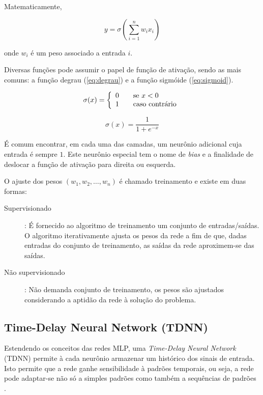 Matematicamente,

\[ y = \sigma ( \sum_{i=1}^{n} w_i x_i ) \]

onde \(w_i\) é um peso associado a entrada \(i\).

Diversas funções pode assumir o papel de função de ativação, sendo as mais comuns:
a função degrau (\ref{eq:degrau}) e a função sigmóide (\ref{eq:sigmoid}).

\begin{equation} \label{eq:degrau}
    \sigma (x) = \left\{
    \begin{array}{l l}
        0 & \quad \text{se } x < 0\\
        1 & \quad \text{caso contrário}
    \end{array} \right.
\end{equation}

\begin{equation} \label{eq:sigmoid}
    \sigma (x) = \frac{1}{1 + e^{-x}}
\end{equation}

É comum encontrar, em cada uma das camadas, um neurônio adicional cuja entrada é sempre \(1\). Este neurônio especial tem o nome de \textit{bias} e a finalidade de deslocar a função de ativação para direita ou esquerda.

O ajuste dos pesos \((w_1, w_2, \dots , w_n)\) é chamado treinamento e existe em duas formas:

\begin{description}
    \item[Supervisionado]: É fornecido ao algoritmo de treinamento um conjunto de entradas/saídas. O algoritmo iterativamente ajusta os pesos da rede a fim de que, dadas entradas do conjunto de treinamento, as saídas da rede aproximem-se das saídas.
    \item[Não supervisionado]: Não demanda conjunto de treinamento, os pesos
são ajustados considerando a aptidão da rede à solução do problema.
\end{description}

\subsection{Time-Delay Neural Network (TDNN)}

Estendendo os conceitos das redes MLP, uma \textit{Time-Delay Neural Network} (TDNN) permite à cada neurônio armazenar um histórico dos sinais de entrada. Isto permite que a rede ganhe sensibilidade à padrões temporais, ou seja, a rede pode adaptar-se não só a simples padrões como também a sequências de padrões \cite{kaiser1994tdnn}.

